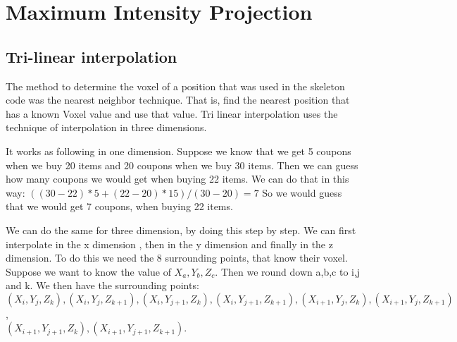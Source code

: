 \section{Maximum Intensity Projection}\label{Sec:Mip}
\subsection{Tri-linear interpolation}
The method to determine the voxel of a position that was used in the skeleton code was the nearest neighbor technique. 
That is, find the nearest position that has a known Voxel value and use that value. 
Tri linear interpolation uses the technique of interpolation in three dimensions.

It works as following in one dimension. 
Suppose we know that we get 5 coupons when we buy 20 items and 20 coupons when we buy 30 items. 
Then we can guess how many coupons we would get when buying 22 items. 
We can do that in this way: $((30-22)*5 + (22-20)*15)/(30-20) = 7$ 
So we would guess that we would get 7 coupons, when buying 22 items.

We can do the same for three dimension, by doing this step by step. 
We can first interpolate in the x dimension , then in the y dimension and finally in the z dimension.
To do this we need the 8 surrounding points, that know their voxel. 
Suppose we want to know the value of $X_{a},Y_{b},Z_{c}$. 
Then we round down a,b,c to i,j and k. 
We then have the surrounding points: $(X_{i},Y_{j},Z_{k}), (X_{i},Y_{j}, Z_{k+1}), (X_{i},Y_{j+1},Z_{k}),
 (X_{i},Y_{j+1},Z_{k+1}), (X_{i+1},Y_{j},Z_{k}), (X_{i+1},Y_{j},Z_{k+1})$, \\ $ (X_{i+1},Y_{j+1},Z_{k}) , (X_{i+1},Y_{j+1},Z_{k+1})$.
 

